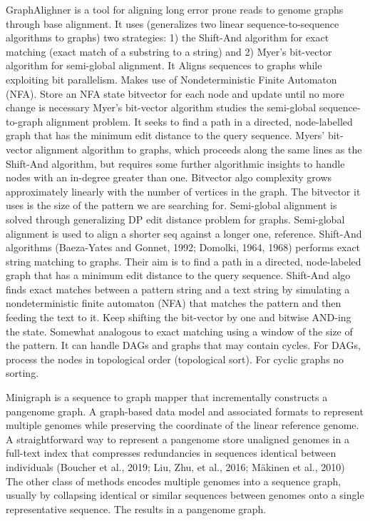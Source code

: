 \documentclass[11pt]{article}
\begin{document}
GraphAlighner \cite{rautiainenBitparallelSequencetographAlignment2019} is a tool 
for aligning long error prone reads to genome graphs through base alignment.
It uses (generalizes two linear sequence-to-sequence algorithms to graphs) two 
strategies: 1) the Shift-And algorithm for exact matching (exact match of a
substring to a string) and 2) Myer’s bit-vector algorithm for semi-global
alignment. It Aligns sequences to graphs while exploiting bit parallelism.
Makes use of Nondeterministic Finite Automaton (NFA).
Store an NFA state bitvector for each node and update until no more change is
necessary Myer’s bit-vector algorithm studies the semi-global sequence-to-graph
alignment problem.
It seeks to find a path in a directed, node-labelled graph that has the
minimum edit distance to the query sequence. Myers’ bit-vector alignment 
algorithm \cite{myersFastBitvectorAlgorithm1999} to graphs, which proceeds along 
the same lines as the Shift-And algorithm, but requires some further algorithmic 
insights to handle nodes with an in-degree greater than one.
Bitvector algo complexity grows approximately linearly with the number of
vertices in the graph.
The bitvector it uses is the size of the pattern we are searching for.
Semi-global alignment is solved through generalizing DP edit distance problem
for graphs.
Semi-global alignment is used to align a shorter seq against a longer one,
reference.
Shift-And algorithms (Baeza-Yates and Gonnet, 1992; Domolki, 1964, 1968) 
performs exact string matching to graphs. 
Their aim is to find a path in a directed, node-labeled graph that has a minimum
edit distance \cite{levenshteinBinaryCodesCapable1966a} to the query sequence. 
Shift-And algo finds exact matches between a pattern string and a text string by
simulating a nondeterministic finite automaton (NFA) that matches the pattern 
and then feeding the text to it.
Keep shifting the bit-vector by one and bitwise AND-ing the state. 
Somewhat analogous to exact matching using a window of the size of the pattern.
It can handle DAGs and  graphs that may contain cycles. For DAGs, process the 
nodes in topological order (topological sort). For cyclic graphs no sorting.

Minigraph \cite{liDesignConstructionReference2020} is a sequence to graph mapper
that incrementally constructs a pangenome graph.
A graph-based data model and associated formats to represent multiple genomes 
while preserving the coordinate of the linear reference genome. 
A straightforward way to represent a pangenome store unaligned genomes in a
full-text index that compresses redundancies in sequences identical between 
individuals (Boucher et al., 2019; Liu, Zhu, et al., 2016; Mäkinen et al., 2010) 		
The other class of methods encodes multiple genomes into a sequence graph, 
usually by collapsing identical or similar sequences between genomes onto a 
single representative sequence. The results in a pangenome graph.
\end{document}
